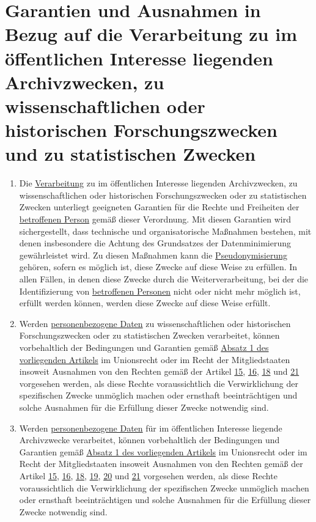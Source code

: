 \chapter{Garantien und Ausnahmen in Bezug auf die Verarbeitung zu im öffentlichen Interesse liegenden Archivzwecken, zu
 wissenschaftlichen oder historischen Forschungszwecken und zu statistischen Zwecken}
\label{ch:89}


\begin{enumerate}

  \item Die \hyperref[itm:04-2]{Verarbeitung} zu im öffentlichen Interesse liegenden Archivzwecken, zu wissenschaftlichen oder historischen
   Forschungszwecken oder zu statistischen Zwecken unterliegt geeigneten Garantien für die Rechte und Freiheiten der
   \hyperref[itm:04-1]{betroffenen Person} gemäß dieser Verordnung. Mit diesen Garantien wird sichergestellt, dass technische und
   organisatorische Maßnahmen bestehen, mit denen insbesondere die Achtung des Grundsatzes der Datenminimierung
   gewährleistet wird. Zu diesen Maßnahmen kann die \hyperref[itm:04-5]{Pseudonymisierung} gehören, sofern es möglich ist, diese Zwecke auf
   diese Weise zu erfüllen. In allen Fällen, in denen diese Zwecke durch die Weiterverarbeitung, bei der die
   Identifizierung von \hyperref[itm:04-1]{betroffenen Personen} nicht oder nicht mehr möglich ist, erfüllt werden können, werden diese
   Zwecke auf diese Weise erfüllt.
  \label{itm:89-1}

  \item Werden \hyperref[itm:04-1]{personenbezogene Daten} zu wissenschaftlichen oder historischen Forschungszwecken oder zu statistischen
   Zwecken verarbeitet, können vorbehaltlich der Bedingungen und Garantien gemäß \hyperref[itm:89-1]{Absatz 1 des
   vorliegenden Artikels} im Unionsrecht oder im Recht der Mitgliedstaaten insoweit Ausnahmen von den Rechten gemäß der
   Artikel \hyperref[ch:15]{15}, \hyperref[ch:16]{16}, \hyperref[ch:18]{18} und \hyperref[ch:21]{21} vorgesehen werden,
   als diese Rechte voraussichtlich die Verwirklichung der spezifischen Zwecke unmöglich machen oder ernsthaft
   beeinträchtigen und solche Ausnahmen für die Erfüllung dieser Zwecke notwendig sind.
  \label{itm:89-2}

  \item Werden \hyperref[itm:04-1]{personenbezogene Daten} für im öffentlichen Interesse liegende Archivzwecke verarbeitet, können
   vorbehaltlich der Bedingungen und Garantien gemäß \hyperref[itm:89-1]{Absatz 1 des vorliegenden Artikels} im
   Unionsrecht oder im Recht der Mitgliedstaaten insoweit Ausnahmen von den Rechten gemäß der Artikel \hyperref[ch:15]
   {15}, \hyperref[ch:16]{16}, \hyperref[ch:18]{18}, \hyperref[ch:19]{19}, \hyperref[ch:20]{20} und \hyperref[ch:21]
   {21} vorgesehen werden, als diese Rechte voraussichtlich die Verwirklichung der spezifischen Zwecke unmöglich machen
   oder ernsthaft beeinträchtigen und solche Ausnahmen für die Erfüllung dieser Zwecke notwendig sind.
  \label{itm:89-3}


\end{enumerate}
